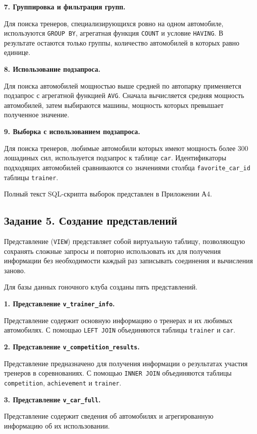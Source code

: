 \documentclass[oneside,a4paper,14pt]{extarticle}
\begin{document}
\textbf{7. Группировка и фильтрация групп.}

Для поиска тренеров, специализирующихся ровно на одном автомобиле, используются \texttt{GROUP BY}, агрегатная функция \texttt{COUNT} и условие \texttt{HAVING}. В результате остаются только группы, количество автомобилей в которых равно единице.

\textbf{8. Использование подзапроса.}

Для поиска автомобилей мощностью выше средней по автопарку применяется подзапрос с агрегатной функцией \texttt{AVG}. Сначала вычисляется средняя мощность автомобилей, затем выбираются машины, мощность которых превышает полученное значение.

\textbf{9. Выборка с использованием подзапроса.}

Для поиска тренеров, любимые автомобили которых имеют мощность более 300 лошадиных сил, используется подзапрос к таблице \texttt{car}. Идентификаторы подходящих автомобилей сравниваются со значениями столбца \texttt{favorite\_car\_id} таблицы \texttt{trainer}.

Полный текст SQL-скрипта выборок представлен в Приложении А4.

\subsection{Задание 5. Создание представлений}

Представление (\texttt{VIEW}) представляет собой виртуальную таблицу, позволяющую сохранять сложные запросы и повторно использовать их для получения информации без необходимости каждый раз записывать соединения и вычисления заново.

Для базы данных гоночного клуба созданы пять представлений.

\textbf{1. Представление \texttt{v\_trainer\_info}.}

Представление содержит основную информацию о тренерах и их любимых автомобилях. С помощью \texttt{LEFT JOIN} объединяются таблицы \texttt{trainer} и \texttt{car}.

\textbf{2. Представление \texttt{v\_competition\_results}.}

Представление предназначено для получения информации о результатах участия тренеров в соревнованиях. С помощью \texttt{INNER JOIN} объединяются таблицы \texttt{competition}, \texttt{achievement} и \texttt{trainer}.

\textbf{3. Представление \texttt{v\_car\_full}.}

Представление содержит сведения об автомобилях и агрегированную информацию об их использовании.
\end{document}
